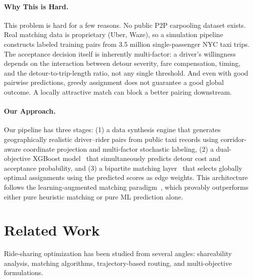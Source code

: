 \documentclass{article}
\begin{document}
\paragraph{Why This is Hard.}
This problem is hard for a few reasons. No public P2P carpooling dataset exists. Real matching data is proprietary (Uber, Waze), so a simulation pipeline constructs labeled training pairs from 3.5 million single-passenger NYC taxi trips. The acceptance decision itself is inherently multi-factor: a driver's willingness depends on the interaction between detour severity, fare compensation, timing, and the detour-to-trip-length ratio, not any single threshold. And even with good pairwise predictions, greedy assignment does not guarantee a good global outcome. A locally attractive match can block a better pairing downstream.

\paragraph{Our Approach.}
Our pipeline has three stages: (1) a data synthesis engine that generates geographically realistic driver--rider pairs from public taxi records using corridor-aware coordinate projection and multi-factor stochastic labeling, (2) a dual-objective XGBoost model~\citep{chen2016xgboost} that simultaneously predicts detour cost and acceptance probability, and (3) a bipartite matching layer~\citep{kuhn1955hungarian} that selects globally optimal assignments using the predicted scores as edge weights. This architecture follows the learning-augmented matching paradigm~\citep{bjorck2021learning}, which provably outperforms either pure heuristic matching or pure ML prediction alone.


\section{Related Work}
\label{sec:related-work}

Ride-sharing optimization has been studied from several angles: shareability analysis, matching algorithms, trajectory-based routing, and multi-objective formulations.
\end{document}
